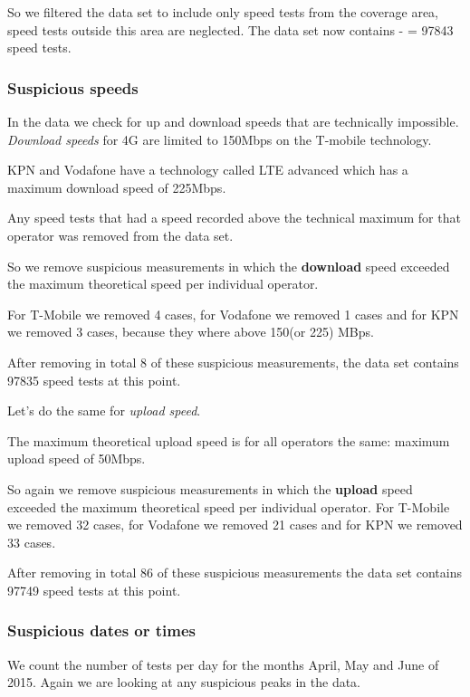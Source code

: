 \documentclass[]{article}
\begin{document}
So we filtered the data set to include only speed tests from the
coverage area, speed tests outside this area are neglected. The data set
now contains - = 97843 speed tests.

\subsubsection{Suspicious speeds}\label{suspicious-speeds}

In the data we check for up and download speeds that are technically
impossible. \emph{Download speeds} for 4G are limited to 150Mbps on the
T-mobile technology.

KPN and Vodafone have a technology called LTE advanced which has a
maximum download speed of 225Mbps.

Any speed tests that had a speed recorded above the technical maximum
for that operator was removed from the data set.

So we remove suspicious measurements in which the \textbf{download}
speed exceeded the maximum theoretical speed per individual operator.

For T-Mobile we removed 4 cases, for Vodafone we removed 1 cases and for
KPN we removed 3 cases, because they where above 150(or 225) MBps.

After removing in total 8 of these suspicious measurements, the data set
contains 97835 speed tests at this point.

Let's do the same for \emph{upload speed}.

The maximum theoretical upload speed is for all operators the same:
maximum upload speed of 50Mbps.

So again we remove suspicious measurements in which the \textbf{upload}
speed exceeded the maximum theoretical speed per individual operator.
For T-Mobile we removed 32 cases, for Vodafone we removed 21 cases and
for KPN we removed 33 cases.

After removing in total 86 of these suspicious measurements the data set
contains 97749 speed tests at this point. \newpage

\subsubsection{Suspicious dates or
times}\label{suspicious-dates-or-times}

We count the number of tests per day for the months April, May and June
of 2015. Again we are looking at any suspicious peaks in the data.
\end{document}
